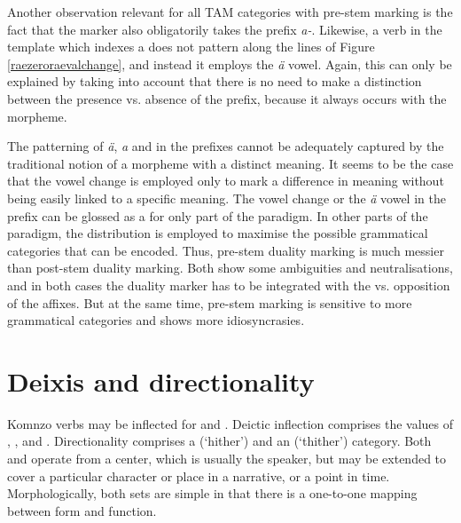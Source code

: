 Another observation relevant for all TAM categories with pre-stem  marking is the fact that the  marker also obligatorily takes the  prefix \emph{a-}. Likewise, a verb in the  template which indexes a   does not pattern along the lines of Figure \ref{raezeroraevalchange}, and instead it employs the \emph{ä} vowel. Again, this can only be explained by taking into account that there is no need to make a distinction between the presence vs. absence of the  prefix, because it always occurs with the  morpheme.%

The patterning of \emph{ä}, \emph{a} and \emph{\Zero} in the prefixes cannot be adequately captured by the traditional notion of a morpheme with a distinct meaning. It seems to be the case that the vowel change is employed only to mark a difference in meaning without being easily linked to a specific meaning. The vowel change or the \emph{ä} vowel in the prefix can be glossed as a  for only part of the paradigm. In other parts of the paradigm, the distribution is employed to maximise the possible grammatical categories that can be encoded. Thus, pre-stem duality marking is much messier than post-stem duality marking. Both show some ambiguities and neutralisations, and in both cases the duality marker has to be integrated with the  vs.  opposition of the  affixes. But at the same time, pre-stem  marking is sensitive to more grammatical categories and shows more idiosyncrasies.

\section{Deixis and directionality} \label{deixisanddirectionality}

Komnzo verbs may be inflected for  and . Deictic inflection comprises the values of , ,  and . Directionality comprises a  (`hither') and an  (`thither') category. Both  and  operate from a  center, which is usually the speaker, but may be extended to cover a particular character or place in a narrative, or a point in time. Morphologically, both sets are simple in that there is a one-to-one mapping between form and function.

